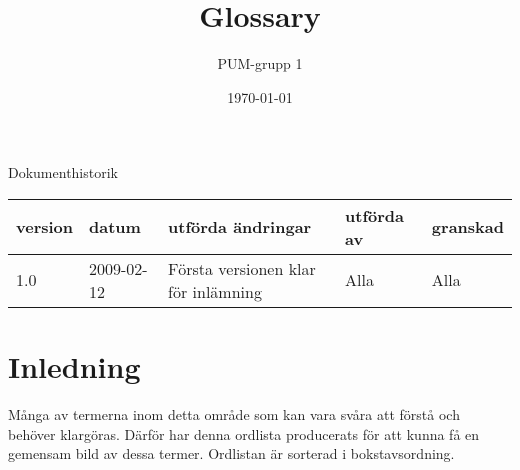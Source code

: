 

\ifpdf
\else
\fi

\title{Glossary}
\author{PUM-grupp 1}
\date{\today}



\maketitle\thispagestyle{empty}

\newpage

{\centering \Large{Dokumenthistorik\\}}

\vspace{10pt}
\begin{tabularx}{\textwidth}{ |l|l|X|l|l| }
  \hline
    \textbf{version} & \textbf{datum} & \textbf{utförda ändringar} & \textbf{utförda av} & \textbf{granskad} \\
	\hline 
  1.0 & 2009-02-12 &  Första versionen klar för inlämning  & Alla & Alla   \\
  \hline
\end{tabularx}

\newpage

\setcounter{tocdepth}{2}
\tableofcontents
\newpage


\section{Inledning}

Många av termerna inom detta område som kan vara svåra att förstå och behöver klargöras. Därför har denna ordlista producerats för att kunna få en gemensam bild av dessa termer. Ordlistan är sorterad i bokstavsordning.

